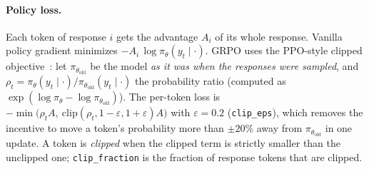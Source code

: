 \documentclass[11pt]{article}
\begin{document}
\paragraph{Policy loss.} Each token of response $i$ gets the advantage $A_i$ of its whole response. Vanilla
policy gradient minimizes $-A_i\,\log\pi_\theta(y_t\mid\cdot)$. GRPO uses the PPO-style clipped
objective~\cite{ppo}: let $\pi_{\theta_\text{old}}$ be the model \emph{as it was when the responses were
sampled}, and $\rho_t = \pi_\theta(y_t\mid\cdot)/\pi_{\theta_\text{old}}(y_t\mid\cdot)$ the probability ratio
(computed as $\exp(\log\pi_\theta - \log\pi_{\theta_\text{old}})$). The per-token loss is
$-\min\bigl(\rho_t A,\ \mathrm{clip}(\rho_t, 1-\varepsilon, 1+\varepsilon)A\bigr)$ with
$\varepsilon = 0.2$ (\texttt{clip\_eps}), which removes the incentive to move a token's probability more than
$\pm 20\%$ away from $\pi_{\theta_\text{old}}$ in one update. A token is \emph{clipped} when the clipped term
is strictly smaller than the unclipped one; \texttt{clip\_fraction} is the fraction of response tokens that
are clipped.
\end{document}
